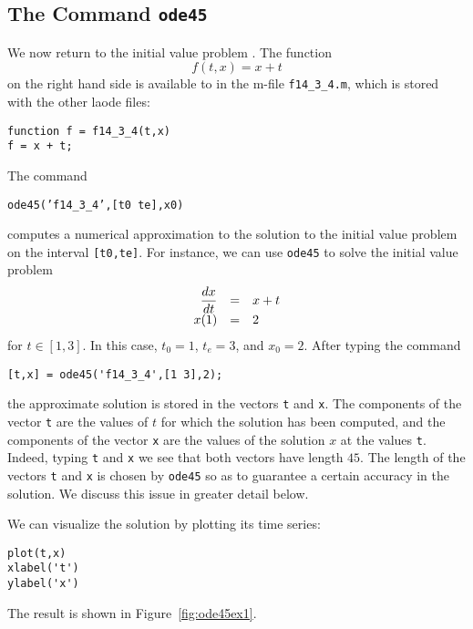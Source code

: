 \subsection*{The \Matlab Command {\tt ode45}}

We now return to the initial value problem .
The function 
\begin{equation*}
f(t,x)=x+t
\end{equation*}
on the right hand side is available to \Matlab in the m-file 
{\tt f14\_3\_4.m}, which is stored with the other {\sf laode\/} files: 
\begin{verbatim}
function f = f14_3_4(t,x)
f = x + t;
\end{verbatim}

The \Matlab command 
\begin{center}
{\tt ode45('f14\_3\_4',[t0 te],x0)}
\end{center} 
computes a numerical approximation to the solution to the initial value 
problem  on the interval {\tt [t0,te]}.
For instance, we can use {\tt ode45} to solve the initial value problem
\begin{equation}  \label{eq:fexam1}
\begin{array}{rcl}
\displaystyle \frac{dx}{dt} & = & x+t \\
x(1) & = & 2
\end{array}
\end{equation}
for $t\in[1,3]$. In this case, $t_0=1$, $t_e=3$, and $x_0=2$.  After 
typing the command
\begin{verbatim}
[t,x] = ode45('f14_3_4',[1 3],2);
\end{verbatim}
the approximate solution is stored in the vectors {\tt t} and {\tt x}.
The components of the vector {\tt t} are the values of $t$ for which the 
solution has been computed, and the components of the vector {\tt x} are 
the values of the solution $x$ at the values {\tt t}.  Indeed, typing 
{\tt t} and {\tt x} we see that both vectors have length $45$.   The
length of the vectors {\tt t} and {\tt x} is chosen by {\tt ode45} so
as to guarantee a certain accuracy in the solution.  We discuss this 
issue in greater detail below.

We can visualize the solution by plotting its time series:
\begin{verbatim}
plot(t,x)
xlabel('t')
ylabel('x')
\end{verbatim}
The result is shown in Figure~\ref{fig:ode45ex1}.  

